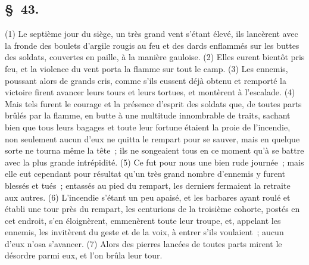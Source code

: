 \documentclass[french,twoside]{book} %
\begin{document}
\subsection[{§ 43.}]{ \textsc{§ 43.} }
\noindent (1) Le septième jour du siège, un très grand vent s’étant élevé, ils lancèrent avec la fronde des boulets d’argile rougis au feu et des dards enflammés sur les buttes des soldats, couvertes en paille, à la manière gauloise. (2) Elles eurent bientôt pris feu, et la violence du vent porta la flamme sur tout le camp. (3) Les ennemis, poussant alors de grands cris, comme s’ils eussent déjà obtenu et remporté la victoire firent avancer leurs tours et leurs tortues, et montèrent à l’escalade. (4) Mais tels furent le courage et la présence d’esprit des soldats que, de toutes parts brûlés par la flamme, en butte à une multitude innombrable de traits, sachant bien que tous leurs bagages et toute leur fortune étaient la proie de l’incendie, non seulement aucun d’eux ne quitta le rempart pour se sauver, mais en quelque sorte ne tourna même la tête ; ils ne songeaient tous en ce moment qu’à se battre avec la plus grande intrépidité. (5) Ce fut pour nous une bien rude journée ; mais elle eut cependant pour résultat qu’un très grand nombre d’ennemis y furent blessés et tués ; entassés au pied du rempart, les derniers fermaient la retraite aux autres. (6) L'incendie s’étant un peu apaisé, et les barbares ayant roulé et établi une tour près du rempart, les centurions de la troisième cohorte, postés en cet endroit, s’en éloignèrent, emmenèrent toute leur troupe, et, appelant les ennemis, les invitèrent du geste et de la voix, à entrer s’ils voulaient ; aucun d’eux n’osa s’avancer. (7) Alors des pierres lancées de toutes parts mirent le désordre parmi eux, et l’on brûla leur tour.
\end{document}
